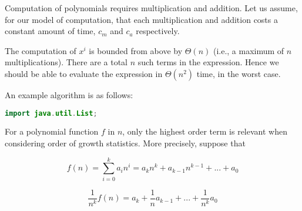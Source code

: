 \documentclass[a4paper,12pt]{article}
\begin{document}

Computation of polynomials requires multiplication and addition. Let us assume, for our model of computation, that each multiplication and addition costs a constant amount of time, $c_m$ and $c_a$ respectively. 

The computation of $x^i$ is bounded from above by $\Theta(n)$  (i.e., a maximum of $n$ multiplications). There are a total $n$ such terms in the expression. Hence we should
be able to evaluate the expression in $\Theta(n^2)$ time, in the worst case. 

An example algorithm is as follows:

\begin{lstlisting}[language=Java]
import java.util.List;

\end{lstlisting}

\vspace{5mm}


For a polynomial function $f$ in $n$, only the highest order term is relevant when considering order of growth statistics. More precisely, suppose that 

\[ f(n) = \sum_{i=0}^k a_in^i = a_kn^k + a_{k-1}n^{k-1} + ... + a_0 \]

\[ \frac{1}{n^k} f(n) = a_k + \frac{1}{n} a_{k-1} + ...  + \frac{1}{n^k}a_0  \]
\end{document}
